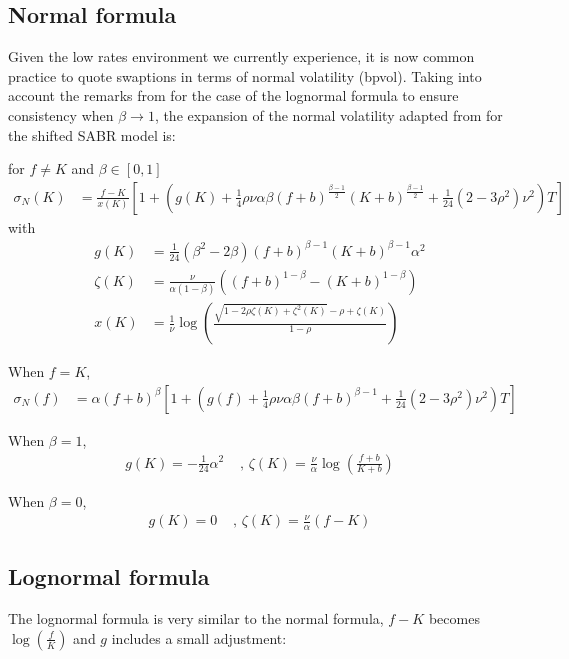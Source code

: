 \documentclass[]{rAMF2e}
\begin{document}
\subsection{Normal formula}
Given the low rates environment we currently experience, it is now common practice to quote swaptions in terms of normal volatility (bpvol). Taking into account the remarks from \citet{obloj2008fine} for the case of the lognormal formula to ensure consistency when $\beta \to 1$, the expansion of the normal volatility adapted from \citet{hagan2002managing} for the shifted SABR model is:

for $f \neq K$ and $\beta \in [0,1]$
\begin{align}
\label{eqn:normal_sabr}
\sigma_N(K) &= \frac{f-K}{x(K)}\left[1+\left(g(K)+\frac{1}{4}\rho\nu\alpha\beta(f+b)^{\frac{\beta-1}{2}}(K+b)^{\frac{\beta-1}{2}}+\frac{1}{24}(2-3\rho^2)\nu^2\right)T\right]
\end{align}
with 
\begin{align*}
g(K) &= \frac{1}{24} (\beta^2-2\beta) (f+b)^{\beta-1} (K+b)^{\beta-1} \alpha^2\\
\zeta(K) &= \frac{\nu}{\alpha (1-\beta)} \left( (f+b)^{1-\beta} - (K+b)^{1-\beta} \right)\\
x(K) &= \frac{1}{\nu}\log\left(\frac{\sqrt{1-2\rho\zeta(K)+\zeta^2(K)}-\rho+\zeta(K)}{1-\rho} \right)
\end{align*}

When $f=K$, 
\begin{align}
\sigma_N(f) &= \alpha (f+b)^\beta \left[1+\left(g(f)+\frac{1}{4}\rho\nu\alpha\beta(f+b)^{\beta-1}+\frac{1}{24}(2-3\rho^2)\nu^2\right)T\right]
\end{align}

When $\beta = 1$,
\begin{align*}
g(K) = -\frac{1}{24}\alpha^2 &\texttt{ , } \zeta(K) = \frac{\nu}{\alpha} \log\left(\frac{f+b}{K+b}\right)
\end{align*}

When $\beta = 0$,
\begin{align*}
g(K) = 0 &\texttt{ , }\zeta(K) = \frac{\nu}{\alpha} \left(f-K\right)
\end{align*}
\subsection{Lognormal formula}
The lognormal formula is very similar to the normal formula, $f-K$ becomes $\log(\frac{f}{K})$ and $g$ includes a small adjustment:
\end{document}

